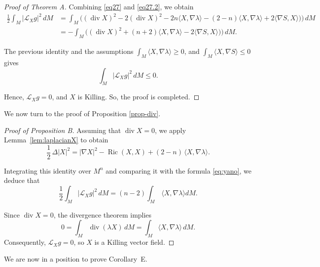 \documentclass[a4paper, 12pt]{amsart}
\theoremstyle{definition}
\numberwithin{figure}{section}
\begin{document}
\begin{proof}[Proof of Theorem A]
Combining \eqref{eq27} and \eqref{eq27.2},
we obtain
$$
\begin{aligned}
\frac{1}{2}\int_M |\mathcal{L}_X g|^{2}\,dM
&=
\int_M \Big(
(\operatorname{div}X)^{2}
-2(\operatorname{div}X)^{2}
-2n\langle X,\nabla\lambda\rangle
-(2-n)\langle X,\nabla\lambda\rangle
+2\langle\nabla S, X\rangle)\Big)\,dM \\
&=
-\int_M \Big(
(\operatorname{div}X)^{2}
+(n+2)\langle X,\nabla\lambda\rangle
-2\langle\nabla S, X\rangle)\Big)\,dM .
\end{aligned}
$$

The previous identity and the assumptions $\int_M \langle X,\nabla\lambda\rangle\ge0$, and $\int_M \langle X,\nabla S\rangle\le0$ gives
$$
\int_M |\mathcal{L}_X g|^{2}\,dM \le 0.
$$

Hence, $\mathcal{L}_X g=0$, and $X$ is Killing. So, the proof is completed.
\end{proof}

We now turn to the proof of Proposition \ref{prop-div}.
\begin{proof}[Proof of Proposition B]Assuming that $\operatorname{div} X = 0$,
we apply Lemma~\ref{lem:laplacianX} to obtain
$$
\frac{1}{2}\,\Delta |X|^{2}
= |\nabla X|^{2}
- \operatorname{Ric}(X,X)
+ (2-n)\,\langle X,\nabla \lambda\rangle .
$$

Integrating this identity over $M^n$ and comparing it with the formula
\eqref{eq:yano}, we deduce that
$$
\frac{1}{2}\int_M | \mathcal{L}_X g |^2 \, dM = (n-2) \int_M\,\langle X,\nabla \lambda\rangle dM.
$$

Since \(\operatorname{div}X=0\), the divergence theorem implies
$$
0 = \int_M \operatorname{div}(\lambda X)\, dM
= \int_M \langle X,\nabla \lambda \rangle \, dM .
$$
Consequently, \(\mathcal{L}_X g =0\), so \(X\) is a Killing vector field.
\end{proof}

We are now in a position to prove Corollary~E.
\end{document}
